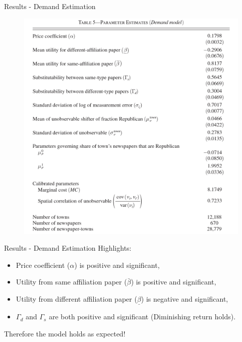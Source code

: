 \documentclass{beamer}
\begin{document}
\begin{frame}[t]{Results - Demand Estimation}
  \begin{figure}
  \begin{center}
    \includegraphics[scale=0.19]{Table5.png}
  \end{center}
  \end{figure}
\end{frame}

\begin{frame}[t]{Results - Demand Estimation}
  Highlights:
  \begin{itemize}
    \item Price coefficient ($\alpha$) is positive and significant,
    \item Utility from same affiliation paper ($\bar\beta$) is positive and significant,
    \item Utility from different affiliation paper ($\underline\beta$) is negative
      and significant,
    \item $\Gamma_d$ and $\Gamma_s$ are both positive and significant (Diminishing
      return holds).
  \end{itemize}

  Therefore the model holds as expected!
\end{frame}
\end{document}
